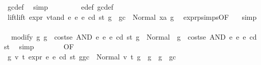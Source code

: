 \begin{isabellebody}
\ gc{\isacharunderscore}{\kern0pt}def\ \isamarkupfalse%
\ simp\isanewline
\ \ \ \ \ \ \isamarkupfalse%
\ {}{}{\isacharparenleft}{\kern0pt}{}{\isacharparenright}{\kern0pt}\ e{\isacharunderscore}{\kern0pt}def\ gc{\isacharunderscore}{\kern0pt}def\ \isamarkupfalse%
\ lift{\isacharcolon}{\kern0pt}{\isachardoublequoteopen}lift\ expr\ vtand\ e{}\ e{}\ e\ cd\ st\ {\isacharparenleft}{\kern0pt}g\ {\isacharminus}{\kern0pt}\ gc{\isacharparenright}{\kern0pt}\ {\isacharequal}{\kern0pt}\ Normal\ {\isacharparenleft}{\kern0pt}xa{\isacharcomma}{\kern0pt}\ g{}{\isacharparenright}{\kern0pt}{\isachardoublequoteclose}\ \isamarkupfalse%
\ expr{\isachardot}{\kern0pt}psimps{\isacharparenleft}{\kern0pt}{}{}{\isacharparenright}{\kern0pt}{\isacharbrackleft}{\kern0pt}OF\ {}{}{\isacharparenleft}{\kern0pt}{}{\isacharparenright}{\kern0pt}{\isacharbrackright}{\kern0pt}\ \isamarkupfalse%
\ simp\isanewline
\ \ \ \ \ \ \isamarkupfalse%
\ \isamarkupfalse%
\ {\isacharasterisk}{\kern0pt}{\isacharasterisk}{\kern0pt}{\isacharcolon}{\kern0pt}\ {\isachardoublequoteopen}modify\ {\isacharparenleft}{\kern0pt}{\isasymlambda}g{\isachardot}{\kern0pt}\ g\ {\isacharminus}{\kern0pt}\ costs\isactrlsub e\ {\isacharparenleft}{\kern0pt}AND\ e{}\ e{}{\isacharparenright}{\kern0pt}\ e\ cd\ st{\isacharparenright}{\kern0pt}\ g\ {\isacharequal}{\kern0pt}\ Normal\ {\isacharparenleft}{\kern0pt}{\isacharparenleft}{\kern0pt}{\isacharparenright}{\kern0pt}{\isacharcomma}{\kern0pt}\ g\ {\isacharminus}{\kern0pt}\ costs\isactrlsub e\ {\isacharparenleft}{\kern0pt}AND\ e{}\ e{}{\isacharparenright}{\kern0pt}\ e\ cd\ st{\isacharparenright}{\kern0pt}{\isachardoublequoteclose}\ \isamarkupfalse%
\ simp\isanewline
\ \ \ \ \ \ \isamarkupfalse%
\ {}{}{\isacharparenleft}{\kern0pt}{}{\isacharparenright}{\kern0pt}{\isacharbrackleft}{\kern0pt}OF\ {\isacharasterisk}{\kern0pt}\ {\isacharasterisk}{\kern0pt}{\isacharasterisk}{\kern0pt}{\isacharbrackright}{\kern0pt}\ \isamarkupfalse%
\ {\isachardoublequoteopen}{\isasymAnd}g{}{\isacharprime}{\kern0pt}\ v{}\ t{}{\isachardot}{\kern0pt}\ expr\ e{}\ e\ cd\ st\ {\isacharparenleft}{\kern0pt}g{\isacharminus}{\kern0pt}gc{\isacharparenright}{\kern0pt}\ {\isacharequal}{\kern0pt}\ Normal\ {\isacharparenleft}{\kern0pt}{\isacharparenleft}{\kern0pt}v{}{\isacharcomma}{\kern0pt}\ t{}{\isacharparenright}{\kern0pt}{\isacharcomma}{\kern0pt}\ g{}{\isacharprime}{\kern0pt}{\isacharparenright}{\kern0pt}\ {\isasymLongrightarrow}\ g{}{\isacharprime}{\kern0pt}\ {\isasymle}\ g\ {\isacharminus}{\kern0pt}\ gc{\isachardoublequoteclose}\ \isamarkupfalse%

\end{isabellebody}
